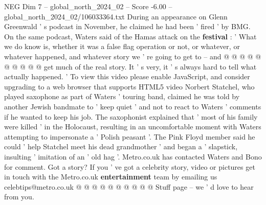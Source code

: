 \begin{textsample}{NEG Dim 7 – global\_north\_2024\_02 – Score -6.00 – global\_north\_2024\_02/106033364.txt}
During an appearance on Glenn Greenwald ' s podcast in November, he claimed he had been ' fired ' by BMG.
On the same podcast, Waters said of the Hamas attack on the \textbf{festival} : ' What we do know is, whether it was a false flag operation or not, or whatever, or whatever happened, and whatever story we ' re going to get to -- and @ @ @ @ @ @ @ @ @ @ get much of the real story.
It ' s very, it ' s always hard to tell what actually happened. ' To view this video please enable JavaScript, and consider upgrading to a web browser that supports HTML5 video Norbert Statchel, who played saxophone as part of Waters ' touring band, claimed he was told by another Jewish bandmate to ' keep quiet ' and not to react to Waters ' comments if he wanted to keep his job.
The saxophonist explained that ' most of his family were killed ' in the Holocaust, resulting in an uncomfortable moment with Waters attempting to impersonate a ' Polish peasant '.
The Pink Floyd member said he could ' help Statchel meet his dead grandmother ' and began a ' slapstick, insulting ' imitation of an ' old hag '.
Metro.co.uk has contacted Waters and Bono for comment.
Got a story?
If you ' ve got a celebrity story, video or pictures get in touch with the Metro.co.uk \textbf{entertainment} team by emailing us celebtips@metro.co.uk @ @ @ @ @ @ @ @ @ @ Stuff page -- we ' d love to hear from you.

\end{textsample}
